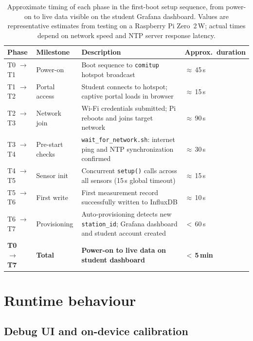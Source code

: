\begin{table}[H]
\centering
\caption[First-Boot Setup Timing Breakdown]{Approximate timing of each phase in the first-boot setup sequence, from power-on to live data visible on the student Grafana dashboard. Values are representative estimates from testing on a Raspberry Pi Zero~2\,W; actual times depend on network speed and NTP server response latency.}
\label{tab:first-boot-timing}
\small
\renewcommand{\arraystretch}{1.25}
\begin{tabularx}{\textwidth}{|P{1.2cm}|P{2.8cm}|X|P{2.2cm}|}
\hline
\textbf{Phase} & \textbf{Milestone} & \textbf{Description} & \textbf{Approx.\ duration} \\
\hline
T0 $\to$ T1 & Power-on & Boot sequence to \texttt{comitup} hotspot broadcast & $\approx$\,45\,s \\
\hline
T1 $\to$ T2 & Portal access & Student connects to hotspot; captive portal loads in browser & $\approx$\,15\,s \\
\hline
T2 $\to$ T3 & Network join & Wi-Fi credentials submitted; Pi reboots and joins target network & $\approx$\,90\,s \\
\hline
T3 $\to$ T4 & Pre-start checks & \texttt{wait\_for\_network.sh}: internet ping and NTP synchronization confirmed & $\approx$\,30\,s \\
\hline
T4 $\to$ T5 & Sensor init & Concurrent \texttt{setup()} calls across all sensors (15\,s global timeout) & $\approx$\,15\,s \\
\hline
T5 $\to$ T6 & First write & First measurement record successfully written to InfluxDB & $\approx$\,10\,s \\
\hline
T6 $\to$ T7 & Provisioning & Auto-provisioning detects new \texttt{station\_id}; Grafana dashboard and student account created & $<$\,60\,s \\
\hline
\textbf{T0 $\to$ T7} & \textbf{Total} & \textbf{Power-on to live data on student dashboard} & $\mathbf{<}$\,\textbf{5\,min} \\
\hline
\end{tabularx}
\end{table}

\section{Runtime behaviour}
\label{sec:runtime-behaviour}

\subsection{Debug UI and on-device calibration}


